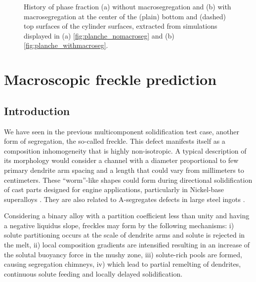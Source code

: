 \begin{figure}[htbp]
\begin{subfigure}[t]{0.6\textwidth}
	\caption{}
    \label{fig:tp_withmacroseg}
  \end{subfigure}
\caption{History of phase fraction (a) without macrosegregation and (b) with 
macrosegregation at the center of the (plain) bottom and (dashed) top surfaces 
of the cylinder surfaces, extracted from simulations displayed in (a) \cref{fig:planche_nomacroseg}
and (b) \cref{fig:planche_withmacroseg}.} 
\label{fig:tp_macroseg_influence}
\end{figure}
%
\section{Macroscopic freckle prediction}
\subsection{Introduction}
\label{sec:intro_freckle}
We have seen in the previous multicomponent solidification test case, another form of segregation, the so-called freckle. 
This defect manifests itself as a composition inhomogeneity that is highly non-isotropic. A typical description of its 
morphology would consider a channel with a diameter proportional to few primary dendrite arm spacing and a length that 
could vary from millimeters to centimeters. These “worm”-like shapes could form during directional solidification of cast 
parts designed for engine applications, particularly in Nickel-base superalloys \citep{giamei_nature_1970,beckermann_development_2000,
genereux_characterization_2000,schneider_modeling_1997}. They are also related to A-segregates defects in large steel ingots 
\citep{pickering_macrosegregation_2013}. 

Considering a binary alloy with a partition coefficient less than unity and having a negative liquidus slope, 
freckles may form by the following mechanisms: i) solute partitioning occurs at the scale of dendrite arms and 
solute is rejected in the melt, ii) local composition gradients are intensified resulting in an increase of the 
solutal buoyancy force in the mushy zone, iii) solute-rich pools are formed, causing segregation chimneys, iv) 
which lead to partial remelting of dendrites, continuous solute feeding and locally delayed solidification.

